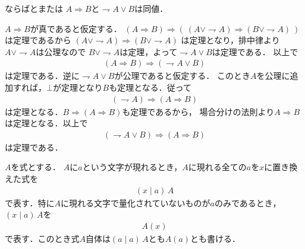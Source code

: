 	\begin{itembox}[l]{ならばとまたは}
		$A \Longrightarrow B$と$\rightharpoondown A \vee B$は同値．
	\end{itembox}
	
	\begin{prf}
		$A \Longrightarrow B$が真であると仮定する．
		$(A \Longrightarrow B) \Longrightarrow (\ (A \vee \rightharpoondown A) \Longrightarrow (B \vee \rightharpoondown A)\ )$は定理であるから
		$(A \vee \rightharpoondown A) \Longrightarrow (B \vee \rightharpoondown A)$
		は定理となり，排中律より$A \vee \rightharpoondown A$は公理なので
		$B \vee \rightharpoondown A$は定理，よって$\rightharpoondown A \vee B$は定理である．
		以上で
		\begin{align}
			(A \Longrightarrow B) \Longrightarrow (\rightharpoondown A \vee B)
		\end{align}
		は定理である．逆に$\rightharpoondown A \vee B$が公理であると仮定する．
		このとき$A$を公理に追加すれば，$\bot$が定理となり$B$も定理となる．従って
		\begin{align}
			(\rightharpoondown A) \Longrightarrow (A \Longrightarrow B)
		\end{align}
		は定理となる．$B \Longrightarrow (A \Longrightarrow B)$も定理であるから，
		場合分けの法則より$A \Longrightarrow B$は定理となる．以上で
		\begin{align}
			(\rightharpoondown A \vee B) \Longrightarrow (A \Longrightarrow B)
		\end{align}
		は定理である．
	\end{prf}
	
	$A$を式とする．
	$A$に$a$という文字が現れるとき，$A$に現れる全ての$a$を$x$に置き換えた式を
	\begin{align}
		(x \mid a)\, A
	\end{align}
	で表す．特に$A$に現れる文字で量化されていないものが$a$のみであるとき，
	$(x \mid a)\, A$を
	\begin{align}
		A(x)
	\end{align}
	で表す．このとき式$A$自体は$(a \mid a)\, A$とも$A(a)$とも書ける．
	
	
